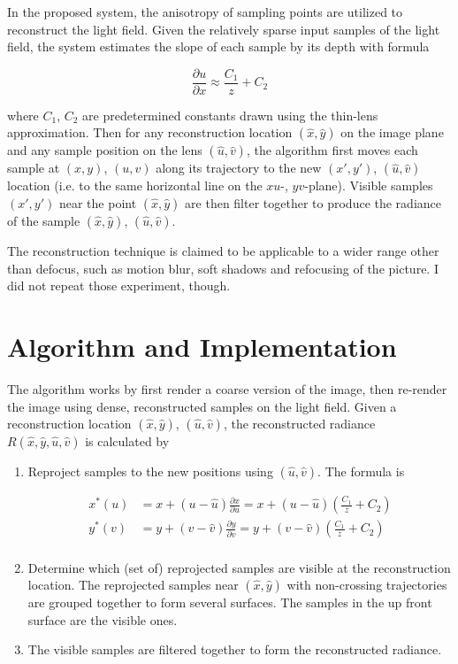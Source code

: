 \documentclass{article}
\begin{document}
In the proposed system, the anisotropy of sampling points are utilized to reconstruct the light field. Given the relatively sparse input samples of the light field, the system estimates the slope of each sample by its depth with formula

\[ \frac{\partial u}{\partial x}\approx \frac{C_1}{z} + C_2 \]

where $C_1$, $C_2$ are predetermined constants drawn using the thin-lens approximation. Then for any reconstruction location $(\hat{x},\hat{y})$ on the image plane and any sample position on the lens $(\hat{u},\hat{v})$, the algorithm first moves each sample at $(x,y)$, $(u,v)$ along its trajectory to the new $(x',y')$, $(\hat{u},\hat{v})$ location (i.e. to the same horizontal line on the $xu$-, $yv$-plane). Visible samples $(x',y')$ near the point $(\hat{x},\hat{y})$ are then filter together to produce the radiance of the sample $(\hat{x},\hat{y})$, $(\hat{u},\hat{v})$.

The reconstruction technique is claimed to be applicable to a wider range other than defocus, such as motion blur, soft shadows and refocusing of the picture. I did not repeat those experiment, though.

\section{Algorithm and Implementation}
The algorithm works by first render a coarse version of the image, then re-render the image using dense, reconstructed samples on the light field. Given a reconstruction location $(\hat{x},\hat{y})$, $(\hat{u},\hat{v})$, the reconstructed radiance $R(\hat{x},\hat{y},\hat{u},\hat{v})$ is calculated by

\begin{enumerate}
\item Reproject samples to the new positions using $(\hat{u},\hat{v})$. The formula is

\[\begin{aligned}
x^*(u) &= x + (u - \hat{u})\frac{\partial x}{\partial u} = x + (u - \hat{u})\left(\frac{C_1}{z} + C_2\right) \\
y^*(v) &= y + (v - \hat{v})\frac{\partial y}{\partial v} = y + (v - \hat{v})\left(\frac{C_1}{z} + C_2\right) \\
\end{aligned}\]

\item Determine which (set of) reprojected samples are visible at the reconstruction location. The reprojected samples near $(\hat{x},\hat{y})$ with non-crossing trajectories are grouped together to form several surfaces. The samples in the up front surface are the visible ones.

\item The visible samples are filtered together to form the reconstructed radiance.
\end{enumerate}
\end{document}
